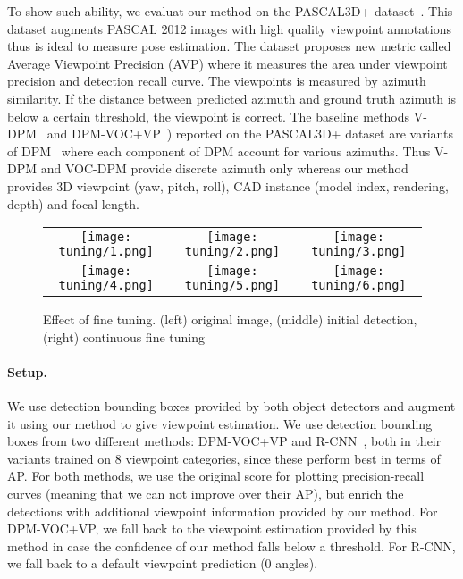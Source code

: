 To show such ability, we evaluat our method on the PASCAL3D+
dataset~\cite{Xiang14}. This dataset augments PASCAL 2012 images with
high quality viewpoint annotations thus is ideal to measure pose
estimation. The dataset proposes new metric called Average Viewpoint
Precision (AVP) where it measures the area under viewpoint precision
and detection recall curve. The viewpoints is measured by azimuth
similarity. If the distance between predicted azimuth and ground truth
azimuth is below a certain threshold, the viewpoint is correct.
The baseline methods V-DPM~\cite{Xiang14} and
DPM-VOC+VP~\cite{Pepik12}) reported on the PASCAL3D+ dataset are
variants of DPM~\cite{Felzenszwalb10} where each component of DPM
account for various azimuths. Thus V-DPM and VOC-DPM provide discrete
azimuth only whereas our method provides 3D viewpoint (yaw, pitch,
roll), CAD instance (model index, rendering, depth) and focal length.
%
\begin{figure}[t]
 \begin{center}
    \setlength\tabcolsep{0pt}
    \begin{tabular}{ccc}
   \texttt{[image: tuning/1.png]} &
   \texttt{[image: tuning/2.png]} &
   \texttt{[image: tuning/3.png]} \\[-5pt]
   \texttt{[image: tuning/4.png]} &
   \texttt{[image: tuning/5.png]} &
   \texttt{[image: tuning/6.png]} \\[-5pt]
   \end{tabular}
 \end{center}
 \caption{Effect of fine tuning. (left) original image, (middle) initial detection, (right) continuous fine tuning}
 \label{fig:tuning}
\end{figure}

\paragraph{Setup.}
We use detection bounding boxes provided by both object detectors and
augment it using our method to give viewpoint estimation. We use
detection bounding boxes from two different methods:
DPM-VOC+VP\cite{Pepik12} and R-CNN~\cite{Girshick14}, both in their
variants trained on 8 viewpoint categories, since these perform best
in terms of AP. For both methods,
we use the original score for plotting precision-recall curves
(meaning that we can not improve over their AP), but
enrich the detections with additional viewpoint information provided
by our method. For DPM-VOC+VP, we fall back to the viewpoint
estimation provided by this method in case the confidence of our
method falls below a threshold. For R-CNN, we fall back to a default
viewpoint prediction ($0$ angles).

